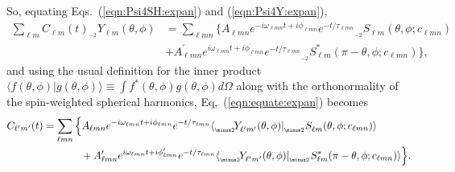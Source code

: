 \documentclass[11pt]{article}
\newcommand{\braket}[2]{\langle #1|#2\rangle}
\newcommand{\swY}[4][]{{}_{{}_{#2}}\!Y^{#1}_{#3}(#4)}
\newcommand{\swSH}[5][]{{}_{{}_{#2}}S^{#1}_{#3}(#4;#5)}
\begin{document}
So, equating Eqs.~(\ref{eqn:Psi4SH:expan}) and (\ref{eqn:Psi4Y:expan}), 
\begin{equation} \label{eqn:equate:expan}
\begin{aligned}
\sum_{\ell{m}} C_{\ell{m}}(t) \swY{\minus 2}{\ell{m}}{\theta,\phi} & = \sum_{\ell{m}n} \Big\{ A_{\ell{m}n} e^{-i\omega_{\ell{m}n}t+i\phi_{\ell{m}n}}e^{-t/\tau_{\ell{m}n}} \swSH{\minus 2}{\ell{m}}{\theta,\phi}{c_{\ell{m}n}}\\
& + A^\prime_{\ell{m}n} e^{i\omega_{\ell{m}n}t+i\phi^\prime_{\ell{m}n}}e^{-t/\tau_{\ell{m}n}} \swSH[*]{\minus 2}{\ell{m}}{\pi-\theta,\phi}{c_{\ell{m}n}} \Big\},
\end{aligned}
\end{equation}
and using the usual definition for the inner product $\braket{f(\theta, \phi)}{g(\theta, \phi)} \equiv \int{f^{*}(\theta, \phi) g(\theta, \phi) d\Omega}$ along with the orthonormality of the spin-weighted spherical harmonics, Eq,~(\ref{eqn:equate:expan}) becomes
\begin{equation} \label{clm:eq2}
\begin{aligned}
C_{\ell^\prime{m^\prime}}(t) &= \sum_{\ell{m}n} \Big\{ 
   A_{\ell{m}n} e^{-i\omega_{\ell{m}n}t+i\phi_{\ell{m}n}}e^{-t/\tau_{\ell{m}n}} 
   \braket{\swY{\minus 2}{\ell^\prime{m^\prime}}{\theta,\phi}}{\swSH{\minus 2}{\ell{m}}{\theta,\phi}{c_{\ell{m}n}}} \\
& {}\hspace{0.5in} 
  + A^\prime_{\ell{m}n} e^{i\omega_{\ell{m}n}t+i\phi^\prime_{\ell{m}n}}e^{-t/\tau_{\ell{m}n}} 
   \braket{\swY{\minus 2}{\ell^\prime{m^\prime}}{\theta,\phi}}{\swSH[*]{\minus 2}{\ell{m}}{\pi-\theta,\phi}{c_{\ell{m}n}}} \Big\}.
\end{aligned}
\end{equation}
\end{document}
